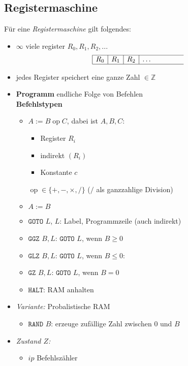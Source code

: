 \subsection{Registermaschine}
\Defi Für eine \emph{Registermaschine} gilt folgendes:
    \begin{itemize}
    \item $\infty$ viele register $R_0, R_1, R_2, ...$
          \[
           \begin{array}{|c|c|c|ccccc}
            \hline
            R_0 & R_1 & R_2 & \dots & & & & \\
            \hline
           \end{array}
          \]
    \item jedes Register speichert eine ganze Zahl $\in \mathbb{Z}$
    \item \textbf{Programm} endliche Folge von Befehlen\\
		\textbf{Befehlstypen}
		\begin{itemize}
		 \item $A := B \operatorname{op} C$, dabei ist $A,B,C$: 
			\begin{itemize}
			 \item Register $R_i$
			 \item indirekt $(R_i)$
			 \item Konstante $c$
			\end{itemize}
			$\operatorname{op} \in \{+,-,\times,/\}$ ($/$ als ganzzahlige Division)
		 \item $A := B$
         \item $\texttt{GOTO } L$, $L$: Label, Programmzeile (auch indirekt)
         \item $\texttt{GGZ } B, L$: $\texttt{GOTO } L$, wenn $B \geq 0$ 
         \item $\texttt{GLZ } B, L$: $\texttt{GOTO } L$, wenn $B \leq 0:$ 
         \item $\texttt{GZ } B, L$: $\texttt{GOTO } L$, wenn $B = 0$
         \item $\texttt{HALT}$: RAM anhalten
		\end{itemize}
	\item \emph{Variante:} Probalistische RAM
		\begin{itemize}
		 \item $\texttt{RAND } B$: erzeuge zufällige Zahl zwischen 0 und $B$
		\end{itemize}
    \item \emph{Zustand $Z$:}
		\begin{itemize}
		 \item $ip$ Befehlszähler

\end{itemize}
\end{itemize}
